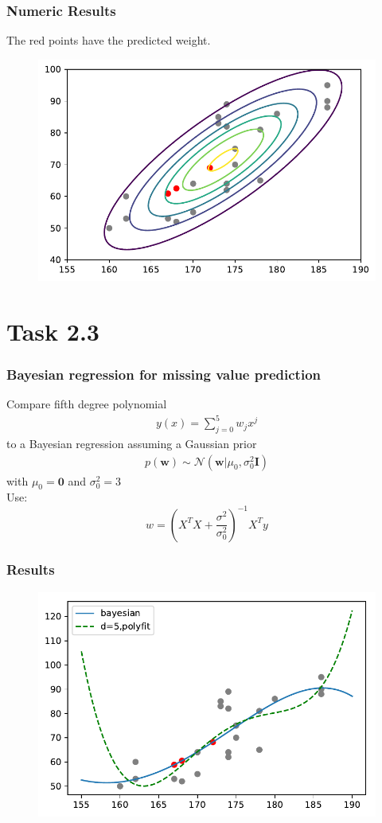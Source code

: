 \documentclass{beamer}
\begin{document}
\begin{frame}
	\frametitle{Numeric Results}
	The red points have the predicted weight.
	\begin{figure}
		\includegraphics[width=0.9\linewidth]{graphics/contours}
	\end{figure}
\end{frame}

\section{Task 2.3}

\begin{frame}
\frametitle{Bayesian regression for missing value prediction}
Compare fifth degree polynomial
\begin{align*}
y(x) = \sum_{j=0}^{5}w_jx^j
\end{align*}
to a Bayesian regression assuming a Gaussian prior
\begin{align*}
p(\mathbf{w}) \sim \mathcal{N}(\mathbf{w}|\mu_0,\sigma^2_0\mathbf{I})
\end{align*}
with $\mu_0=\mathbf{0}$ and $\sigma^2_0=3$ \\\medskip
Use: \[w = (X^TX + \frac{\sigma^2}{\sigma_0^2})^{-1}X^Ty\]

\end{frame}

\begin{frame}
	\frametitle{Results}
	\begin{figure}
		\includegraphics[height=0.8\textheight]{graphics/task3}
	\end{figure}
\end{frame}
\end{document}
